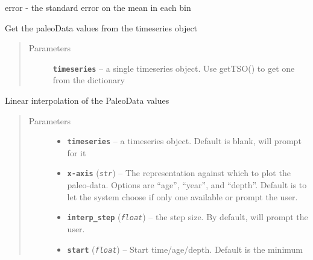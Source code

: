 \documentclass[letterpaper,10pt,english]{sphinxmanual}
\begin{document}
\begin{fulllineitems}
\begin{fulllineitems}
\begin{description}
error - the standard error on the mean in each bin

\end{description}

\end{fulllineitems}


\begin{fulllineitems}
\label{Basic:pyleoclim.Basic.getValues}
Get the paleoData values from the timeseries object
\begin{quote}\begin{description}
\item[{Parameters}] \leavevmode
\textbf{\texttt{timeseries}} -- a single timeseries object. Use getTSO() to get
one from the dictionary

\end{description}\end{quote}

\end{fulllineitems}


\begin{fulllineitems}
\label{Basic:pyleoclim.Basic.interp_data}
Linear interpolation of the PaleoData values
\begin{quote}\begin{description}
\item[{Parameters}] \leavevmode\begin{itemize}
\item {} 
\textbf{\texttt{timeseries}} -- a timeseries object. Default is blank, will prompt for it

\item {} 
\textbf{\texttt{x-axis}} (\emph{\texttt{str}}) -- The representation against which to plot the
paleo-data. Options are ``age'', ``year'', and ``depth''.
Default is to let the system choose if only one available
or prompt the user.

\item {} 
\textbf{\texttt{interp\_step}} (\emph{\texttt{float}}) -- the step size. By default, will prompt the user.

\item {} 
\textbf{\texttt{start}} (\emph{\texttt{float}}) -- Start time/age/depth. Default is the minimum


\end{itemize}
\end{description}
\end{quote}
\end{fulllineitems}
\end{fulllineitems}
\end{document}
